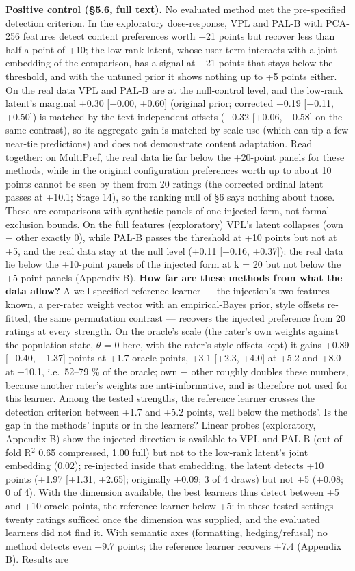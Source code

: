\documentclass{article}
\begin{document}
\textbf{Positive control (\S{}5.6, full text).} No evaluated method met the pre-specified detection criterion. In the exploratory dose-response, VPL and PAL-B with PCA-256 features detect content preferences worth +21 points but recover less than half a point of +10; the low-rank latent, whose user term interacts with a joint embedding of the comparison, has a signal at +21 points that stays below the threshold, and with the untuned prior it shows nothing up to +5 points either. On the real data VPL and PAL-B are at the null-control level, and the low-rank latent's marginal +0.30 {[}$-$0.00, +0.60{]} (original prior; corrected +0.19 {[}$-$0.11, +0.50{]}) is matched by the text-independent offsets (+0.32 {[}+0.06, +0.58{]} on the same contrast), so its aggregate gain is matched by scale use (which can tip a few near-tie predictions) and does not demonstrate content adaptation. Read together: on MultiPref, the real data lie far below the +20-point panels for these methods, while in the original configuration preferences worth up to about 10 points cannot be seen by them from 20 ratings (the corrected ordinal latent passes at +10.1; Stage 14), so the ranking null of \S{}6 says nothing about those. These are comparisons with synthetic panels of one injected form, not formal exclusion bounds. On the full features (exploratory) VPL's latent collapses (own $-$ other exactly 0), while PAL-B passes the threshold at +10 points but not at +5, and the real data stay at the null level (+0.11 {[}$-$0.16, +0.37{]}): the real data lie below the +10-point panels of the injected form at k = 20 but not below the +5-point panels (Appendix B). \textbf{How far are these methods from what the data allow?} A well-specified reference learner --- the injection's two features known, a per-rater weight vector with an empirical-Bayes prior, style offsets re-fitted, the same permutation contrast --- recovers the injected preference from 20 ratings at every strength. On the oracle's scale (the rater's own weights against the population state, $\theta$ = 0 here, with the rater's style offsets kept) it gains +0.89 {[}+0.40, +1.37{]} points at +1.7 oracle points, +3.1 {[}+2.3, +4.0{]} at +5.2 and +8.0 at +10.1, i.e.~52--79 \% of the oracle; own $-$ other roughly doubles these numbers, because another rater's weights are anti-informative, and is therefore not used for this learner. Among the tested strengths, the reference learner crosses the detection criterion between +1.7 and +5.2 points, well below the methods'. Is the gap in the methods' inputs or in the learners? Linear probes (exploratory, Appendix B) show the injected direction is available to VPL and PAL-B (out-of-fold R$^2$ 0.65 compressed, 1.00 full) but not to the low-rank latent's joint embedding (0.02); re-injected inside that embedding, the latent detects +10 points (+1.97 {[}+1.31, +2.65{]}; originally +0.09; 3 of 4 draws) but not +5 (+0.08; 0 of 4). With the dimension available, the best learners thus detect between +5 and +10 oracle points, the reference learner below +5: in these tested settings twenty ratings sufficed once the dimension was supplied, and the evaluated learners did not find it. With semantic axes (formatting, hedging/refusal) no method detects even +9.7 points; the reference learner recovers +7.4 (Appendix B). Results are 
\end{document}

